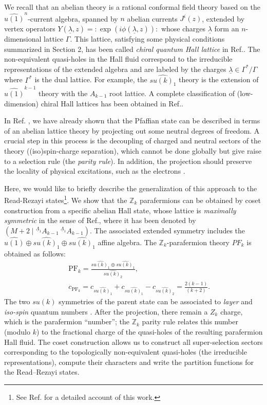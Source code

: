 \documentclass[a4paper,12pt]{article}
\newcommand{\beqa}{\begin{eqnarray}}
\newcommand{\eeqa}{\end{eqnarray}}
\newcommand{\nn}{\nonumber \\}
\newcommand {\np}[1]{ {\mathrm{:}}{#1}{\mathrm{:}} } %
\def \l {\underline{\lambda}}
\def \L {\underline{\Lambda}}
\def \Z {{\mathbb Z}}
\def \G   {\Gamma}
\def\U1{{\widehat{u(1)}}}
\def \PF {\mathrm{PF}}
\begin{document}
We recall that an abelian theory is a rational
conformal field theory based on the $\U1^n$-current algebra,
spanned by $n$ abelian currents $J^i(z)$, extended by
vertex operators $Y(\l,z)=\np{\exp(i\phi(\l,z))}$ whose charges
$\l$ form an $n$-dimensional lattice $\G$.
This lattice, satisfying some physical conditions summarized in Section 2, 
has been called {\it chiral quantum Hall lattice} in Ref.\cite{fro}.
The non-equivalent quasi-holes in the Hall fluid correspond to the irreducible
representations of the extended algebra and are labeled by
the charges $\l\in\G^*/\G$ where $\G^*$ is the dual
lattice.
For example, the $\widehat{su(k)_1}$ theory is the extension
of $\U1^{k-1}$ theory with the $A_{k-1}$ root lattice. 
A complete classification of (low-dimension) chiral Hall lattices
has been obtained in Ref.\cite{fro}.

In Ref. \cite{cgt}, we have already shown that the Pfaffian state
can be described in terms of an abelian lattice theory 
by projecting out some neutral degrees of freedom.
A crucial step in this process is the decoupling of charged and
neutral sectors of the theory ((iso)spin-charge separation), which
cannot be done globally but give raise to a selection rule
(the {\it parity rule}). 
In addition, the projection should preserve the locality of
physical excitations, such as the electrons \cite{cgt}.

Here, we would like to briefly describe the generalization
of this approach to the Read-Rezayi states\footnote{
See Ref.\cite{cgt2} for a detailed account of this work.}.
We show that the $\Z_k$ parafermions can be
obtained by coset construction \cite{gko} from a specific 
abelian Hall state, whose lattice is {\it maximally symmetric}
in the sense of Ref.\cite{fro}, where it has been denoted by
$(M+2 \; | \; {}^{\L_1}A_{k-1} \ {}^{\L_1}A_{k-1})$.
The associated extended symmetry includes the
$\U1\oplus\widehat{su(k)_1}\oplus \widehat{su(k)_1}$ affine algebra.
The $\Z_k$-parafermion theory $PF_k$ is obtained as follows:
\beqa\label{1.4}
&&\PF_k=
\frac{\widehat{su(k)_1}\oplus \widehat{su(k)_1}}{\widehat{su(k)_2}},
\nn
&& c_{\PF_k}=c_{\widehat{su(k)_1}} + c_{\widehat{su(k)_1}} -
c_{\widehat{su(k)_2}} =\frac{2(k-1)}{(k+2)}  .
\eeqa
The two $su(k)$ symmetries of the parent state can be 
associated to {\it layer} and {\it iso-spin} quantum numbers \cite{cgt2}.
After the projection, there remain a $Z_k$ charge, 
which is the parafermion ``number'';
the $\Z_k$ parity rule relates this number (modulo $k$) to
the fractional charge of the quasi-holes of the resulting 
parafermion Hall fluid.
The coset construction allows us to construct all
super-selection sectors corresponding to the topologically non-equivalent
quasi-holes (the irreducible representations),
compute their characters  and
write the  partition functions for the Read--Rezayi states.
\end{document}

